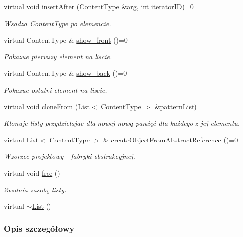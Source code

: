 \begin{DoxyCompactItemize}
virtual void \hyperlink{class_list_ade0efb407e46f2f049e07159da017996}{insert\-After} (Content\-Type \&arg, int iterator\-I\-D)=0
\begin{DoxyCompactList}\small\item\em Wsadza Content\-Type po elemencie. \end{DoxyCompactList}\item 
virtual Content\-Type \& \hyperlink{class_list_a2c7a4d0c74230bbf7486026cc25952fb}{show\-\_\-front} ()=0
\begin{DoxyCompactList}\small\item\em Pokazue pierwszy element na liscie. \end{DoxyCompactList}\item 
virtual Content\-Type \& \hyperlink{class_list_ae6d8b6a4b0e8c18eca287821cbf3ee86}{show\-\_\-back} ()=0
\begin{DoxyCompactList}\small\item\em Pokazue ostatni element na liscie. \end{DoxyCompactList}\item 
virtual void \hyperlink{class_list_a8a1ebc7ce83d77b83f58bd8c2ce2d683}{clone\-From} (\hyperlink{class_list}{List}$<$ Content\-Type $>$ \&pattern\-List)
\begin{DoxyCompactList}\small\item\em Klonuje listy przydzielajac dla nowej nową pamięć dla każdego z jej elementu. \end{DoxyCompactList}\item 
virtual \hyperlink{class_list}{List}$<$ Content\-Type $>$ \& \hyperlink{class_list_a87870a63c8d7bb7530356d9278e766a9}{create\-Object\-From\-Abstract\-Reference} ()=0
\begin{DoxyCompactList}\small\item\em Wzorzec projektowy -\/ fabryki abstrakcyjnej. \end{DoxyCompactList}\item 
virtual void \hyperlink{class_list_a5c203187cbe44bdae313494542140a33}{free} ()
\begin{DoxyCompactList}\small\item\em Zwalnia zasoby listy. \end{DoxyCompactList}\item 
virtual \hyperlink{class_list_a93822e6461a4e3e084269edce851f7d3}{$\sim$\-List} ()
\end{DoxyCompactItemize}


\subsubsection{Opis szczegółowy}
